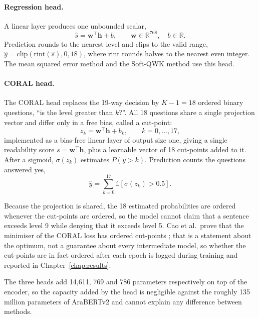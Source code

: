 \paragraph{Regression head.} A linear layer produces one unbounded scalar,
\begin{equation}
\hat{s} = \mathbf{w}^{\top}\mathbf{h} + b, \qquad \mathbf{w}\in\mathbb{R}^{768},\quad
b\in\mathbb{R}.
\end{equation}
Prediction rounds to the nearest level and clips to the valid range,
$\hat{y} = \mathrm{clip}(\mathrm{rint}(\hat{s}), 0, 18)$, where $\mathrm{rint}$ rounds halves
to the nearest even integer. The mean squared error method and the Soft-QWK method use this
head.

\paragraph{CORAL head.} The CORAL head \cite{cao2020coral} replaces the 19-way decision by
$K-1=18$ ordered binary questions, ``is the level greater than $k$?''. All 18 questions share a
single projection vector and differ only in a free bias, called a cut-point:
\begin{equation}
z_k = \mathbf{w}^{\top}\mathbf{h} + b_k, \qquad k = 0,\dots,17 ,
\label{eq:coral-logits}
\end{equation}
implemented as a bias-free linear layer of output size one, giving a single readability score
$s = \mathbf{w}^{\top}\mathbf{h}$, plus a learnable vector of 18 cut-points added to it. After
a sigmoid, $\sigma(z_k)$ estimates $P(y>k)$. Prediction counts the questions answered yes,
\begin{equation}
\hat{y} = \sum_{k=0}^{17} \mathbb{1}\left[\sigma(z_k) > 0.5\right].
\label{eq:coral-decode}
\end{equation}

Because the projection is shared, the 18 estimated probabilities are ordered whenever the
cut-points are ordered, so the model cannot claim that a sentence exceeds level 9 while denying
that it exceeds level 5. Cao et al.\ prove that the minimiser of the CORAL loss has ordered
cut-points \cite{cao2020coral}; that is a statement about the optimum, not a guarantee about
every intermediate model, so whether the cut-points are in fact ordered after each epoch is
logged during training and reported in Chapter~\ref{chap:results}.

The three heads add 14{,}611, 769 and 786 parameters respectively on top of the encoder, so the
capacity added by the head is negligible against the roughly 135 million parameters of AraBERTv2 and
cannot explain any difference between methods.

